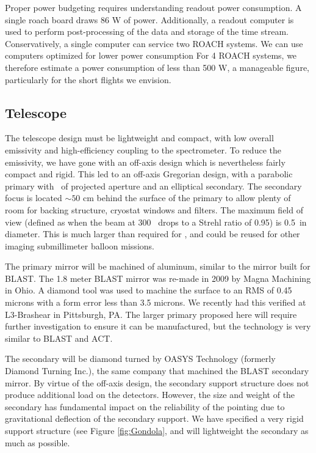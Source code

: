 Proper power budgeting requires understanding readout power consumption.  A single roach board draws 86 W of power.  Additionally, a readout computer 
is used to perform post-processing of the data and storage of the time stream.  Conservatively, a single computer can service two ROACH systems.  We can use computers optimized for lower power consumption  For 4 ROACH systems, we therefore estimate a power consumption of less than 500 W, a manageable figure, particularly for the short flights we envision.  

\subsection{Telescope}
\label{sec:Telescope}

The telescope design must be lightweight and compact, with low overall
emissivity and high-efficiency coupling to the spectrometer.  To
reduce the emissivity, we have gone with an off-axis design which is
nevertheless fairly compact and rigid.  This led to an off-axis
Gregorian design, with a parabolic primary with \D\ of projected
aperture and an elliptical secondary.  The secondary focus is located
$\sim50$ cm behind the surface of the primary to allow plenty of room for
backing structure, cryostat windows and filters.  The maximum field of
view (defined as when the beam at 300 \mum\ drops to a Strehl ratio of
0.95) is 0.5\arcdeg\ in diameter.  This is much larger than required
for \name, and could be reused for other imaging submillimeter
balloon missions.

The primary mirror will be machined of aluminum, similar to the mirror
built for BLAST.  The 1.8 meter BLAST mirror was re-made in 2009 by
Magna Machining in Ohio.  A diamond tool was used to machine the
surface to an RMS of 0.45 microns with a form error less than 3.5
microns.  We recently had this verified at L3-Brashear in Pittsburgh,
PA.  The larger primary proposed here will require further
investigation to ensure it can be manufactured, but the technology is
very similar to BLAST and ACT.

The secondary will be diamond turned by OASYS Technology (formerly
Diamond Turning Inc.), the same company that machined the BLAST
secondary mirror.  By virtue of the off-axis design, the secondary
support structure does not produce additional load on the detectors.
However, the size and weight of the secondary has fundamental impact
on the reliability of the pointing due to gravitational deflection of
the secondary support.  We have specified a very rigid support
structure (see Figure \ref{fig:Gondola}, and will lightweight the
secondary as much as possible.

